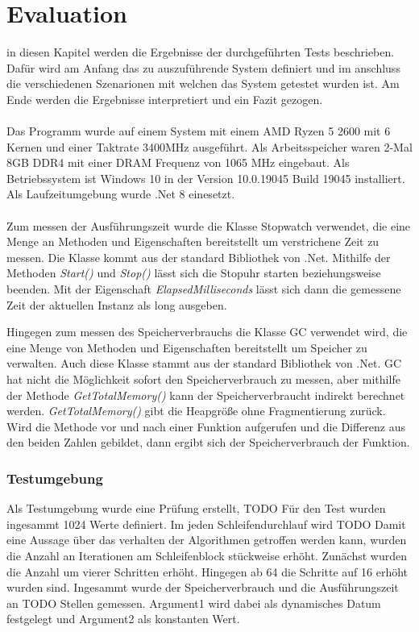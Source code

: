     \chapter{Evaluation}
    \label{Evaluation}
    in diesen Kapitel werden die Ergebnisse der durchgeführten Tests beschrieben.
    Dafür wird am Anfang das zu auszuführende System definiert und im anschluss die verschiedenen Szenarionen mit welchen das System getestet wurden ist.
    Am Ende werden die Ergebnisse interpretiert und ein Fazit gezogen.\\
    \\
    Das Programm wurde auf einem System mit einem AMD Ryzen 5 2600 mit 6 Kernen und einer Taktrate 3400MHz ausgeführt. Als Arbeitsspeicher waren 2-Mal 8GB DDR4 mit einer DRAM Frequenz von 1065 MHz eingebaut. 
    Als Betriebssystem ist Windows 10 in der Version 10.0.19045 Build 19045 installiert. Als Laufzeitumgebung wurde .Net 8 einesetzt.\\
    \\
    Zum messen der Ausführungszeit wurde die Klasse Stopwatch verwendet, die eine Menge an Methoden und Eigenschaften bereitstellt um verstrichene Zeit zu messen.
    Die Klasse kommt aus der standard Bibliothek von .Net.
    Mithilfe der Methoden \textit{Start()} und \textit{Stop()} lässt sich die Stopuhr starten beziehungsweise beenden. Mit der Eigenschaft \textit{ElapsedMilliseconds} lässt sich dann die gemessene Zeit der aktuellen Instanz als long ausgeben.\par
    Hingegen zum messen des Speicherverbrauchs die Klasse GC verwendet wird, die eine Menge von Methoden und Eigenschaften bereitstellt um Speicher zu verwalten.
    Auch diese Klasse stammt aus der standard Bibliothek von .Net.
    GC hat nicht die Möglichkeit sofort den Speicherverbrauch zu messen, aber mithilfe der Methode \textit{GetTotalMemory()} kann der Speicherverbraucht indirekt berechnet werden.
    \textit{GetTotalMemory()} gibt die Heapgröße ohne Fragmentierung zurück. 
    Wird die Methode vor und nach einer Funktion aufgerufen und die Differenz aus den beiden Zahlen gebildet, dann ergibt sich der Speicherverbrauch der Funktion.\\
    \subsection{Testumgebung}
    Als Testumgebung wurde eine Prüfung erstellt, TODO
    Für den Test wurden ingesammt 1024 Werte definiert.
    Im jeden Schleifendurchlauf wird TODO
    Damit eine Aussage über das verhalten der Algorithmen getroffen werden kann, wurden die Anzahl an Iterationen am Schleifenblock stückweise erhöht.
    Zunächst wurden die Anzahl um vierer Schritten erhöht. Hingegen ab 64 die Schritte auf 16 erhöht wurden sind.
    Ingesammt wurde der Speicherverbrauch und die Ausführungszeit an TODO Stellen gemessen.
    Argument1 wird dabei als dynamisches Datum festgelegt und Argument2 als konstanten Wert.
